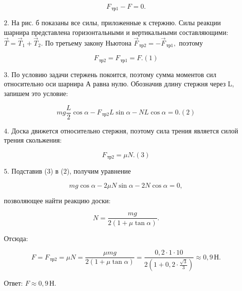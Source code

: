 \documentclass[12pt,a4paper]{article}
\begin{document}
{\[F_{\,\text{тр}1} - F = 0.\]

$2$.  На рис. б показаны все силы, приложенные к стержню. Силы реакции шарнира представлена горизонтальными и вертикальными составляющими: $\vec T = \vec T_1 + \vec T_2.$ По третьему закону Ньютона $\vec F_{\,\text{тр}2} = - \vec F_{\,\text{тр}1},$ поэтому

\[F_{\,\text{тр}2} = F_{\,\text{тр}1} = F. ( 1 )\]

$3$.  По условию задачи стержень покоится, поэтому сумма моментов сил относительно оси шарнира А равна нулю. Обозначив длину стержня через L, запишем это условие:\begin{center}\end{center}

\[mg \frac{L}{2} \cos \alpha - F_{\,\text{тр}2}L \sin \alpha - NL \cos \alpha = 0. ( 2 )\]

$4$.  Доска движется относительно стержня, поэтому сила трения является силой трения скольжения:

\[F_{\,\text{тр}2} = \mu N. ( 3 )\]

$5$.  Подставив ($3$) в ($2$), получим уравнение

\[mg \cos \alpha - 2\mu N \sin \alpha - 2N \cos \alpha = 0,\]

позволяющее найти реакцию доски:

\[N= \frac{mg}{2 ( 1 + \mu \tan \alpha )} .\]

 Отсюда:

\[F=F_{\,\text{тр}2} = \mu N = \frac{\mu mg}{2 ( 1 + \mu \tan \alpha )} = \frac{0{,}2 \cdot 1 \cdot 10}{2 ( 1 + 0{,}2 \cdot \frac{\sqrt{3}}{3} )} \approx 0{,}9\,\text{Н}.\]

Ответ: $F \approx 0{,}9\,\text{Н}.$
}
\end{document}
